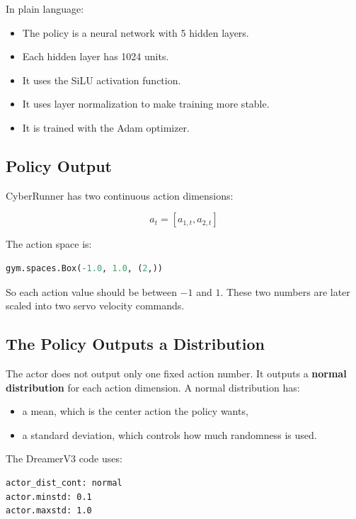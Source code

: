 \documentclass[11pt]{article}
\begin{document}
In plain language:

\begin{itemize}[leftmargin=*]
  \item The policy is a neural network with 5 hidden layers.
  \item Each hidden layer has 1024 units.
  \item It uses the SiLU activation function.
  \item It uses layer normalization to make training more stable.
  \item It is trained with the Adam optimizer.
\end{itemize}

\subsection{Policy Output}

CyberRunner has two continuous action dimensions:

\begin{equation}
a_t = [a_{1,t}, a_{2,t}]
\end{equation}

The action space is:

\begin{lstlisting}[language=Python]
gym.spaces.Box(-1.0, 1.0, (2,))
\end{lstlisting}

So each action value should be between $-1$ and $1$. These two numbers are later scaled into two servo velocity commands.

\subsection{The Policy Outputs a Distribution}

The actor does not output only one fixed action number. It outputs a \textbf{normal distribution} for each action dimension. A normal distribution has:

\begin{itemize}[leftmargin=*]
  \item a mean, which is the center action the policy wants,
  \item a standard deviation, which controls how much randomness is used.
\end{itemize}

The DreamerV3 code uses:

\begin{lstlisting}
actor_dist_cont: normal
actor.minstd: 0.1
actor.maxstd: 1.0
\end{lstlisting}
\end{document}
